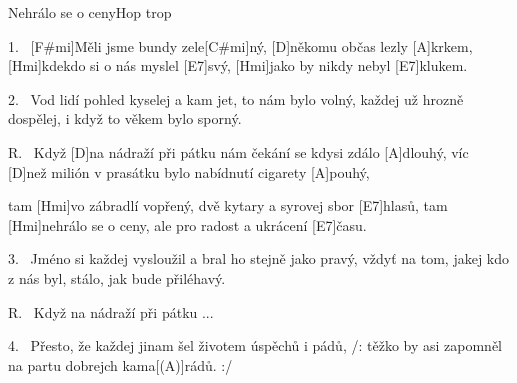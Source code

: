 \begin{song}{Nehrálo se o ceny}{Hop trop}

\begin{xverse}{1.~}
[F#mi]Měli jsme bundy zele[C#mi]ný, [D]někomu občas lezly [A]krkem,
[Hmi]kdekdo si o nás myslel [E7]svý, [Hmi]jako by nikdy nebyl [E7]klukem.
\end{xverse}

\begin{xverse}{2.~}
Vod lidí pohled kyselej a kam jet, to nám bylo volný,
každej už hrozně dospělej, i když to věkem bylo sporný.
\end{xverse}

\begin{xverse}{R.~}
Když [D]na nádraží při pátku nám čekání se kdysi zdálo [A]dlouhý,
víc [D]než milión v prasátku bylo nabídnutí cigarety [A]pouhý,
\end{xverse}

\begin{xverse}{}
tam [Hmi]vo zábradlí vopřený, dvě kytary a syrovej sbor [E7]hlasů,
tam [Hmi]nehrálo se o ceny, ale pro radost a ukrácení [E7]{ča}su.
\end{xverse}

\begin{xverse}{3.~}
Jméno si každej vysloužil a bral ho stejně jako pravý,
vždyť na tom, jakej kdo z nás byl, stálo, jak bude přiléhavý.
\end{xverse}

\begin{xverse}{R.~}
Když na nádraží při pátku ...
\end{xverse}

\begin{xverse}{4.~}
Přesto, že každej jinam šel životem úspěchů i pádů,
/: těžko by asi zapomněl na partu dobrejch kama[(A)]rádů. :/
\end{xverse}

\end{song}


